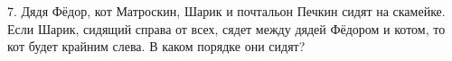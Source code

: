 7. Дядя Фёдор, кот Матроскин, Шарик и почтальон Печкин сидят на скамейке. Если Шарик, сидящий справа от всех, сядет между дядей Фёдором и котом, то кот будет крайним слева. В каком порядке они сидят?\\
